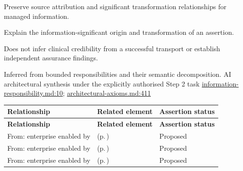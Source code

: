 
Preserve source attribution and significant transformation relationships for managed information.



Explain the information-significant origin and transformation of an assertion.



Does not infer clinical credibility from a successful transport or establish independent assurance findings.


Inferred from bounded responsibilities and their semantic decomposition. AI architectural synthesis under the explicitly authorised Step 2 task \hyperref[evidence:be61392fefb4bb10]{information-responsibility.md:10}; \hyperref[evidence:27549d51551beae6]{architectural-axioms.md:411}
\begingroup\small\setlength{\TableWidth}{\dimexpr\linewidth-6\tabcolsep-4\arrayrulewidth\relax}
\begin{longtable}{|>{\raggedright\arraybackslash}p{0.27\TableWidth}|>{\raggedright\arraybackslash}p{0.48\TableWidth}|>{\raggedright\arraybackslash}p{0.25\TableWidth}|}
\hline\rowcolor{TableHead}\textbf{Relationship} & \textbf{Related element} & \textbf{Assertion status}\\\hline\endfirsthead
\hline\rowcolor{TableHead}\textbf{Relationship} & \textbf{Related element} & \textbf{Assertion status}\\\hline\endhead
\hline\endfoot
From: enterprise enabled by & \nameref{cap:bec-information-lineage-stewardship} (p.\,\pageref{cap:bec-information-lineage-stewardship}) & Proposed\\\hline
From: enterprise enabled by & \nameref{cap:bec-person-identity} (p.\,\pageref{cap:bec-person-identity}) & Proposed\\\hline
From: enterprise enabled by & \nameref{cap:bec-patient-clinical-record} (p.\,\pageref{cap:bec-patient-clinical-record}) & Proposed\\\hline
\end{longtable}\endgroup


